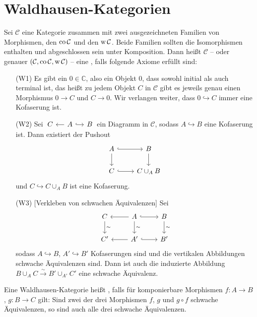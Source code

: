 \section{Waldhausen-Kategorien} %
\label{sec:5}

\begin{definition}[{name=[{Waldhausen Kategorie}]}]
	Sei $\mathcal{C}$ eine Kategorie zusammen mit zwei ausgezeichneten Familien von Morphismen, den  $\operatorname{co} \mathcal{C}$ und den  $\operatorname{w} \mathcal{C}$.
	Beide Familien sollten die Isomorphismen enthalten und abgeschlossen sein unter Komposition.
	Dann heißt $\mathcal{C}$ -- oder genauer $(\mathcal{C},\operatorname{co} \mathcal{C},\operatorname{w} \mathcal{C})$ -- eine , falls folgende Axiome erfüllt sind:
	\begin{enumerate}[(i)]
		\item[(W1)] Es gibt ein  $0 \in \mathbb{C}$, also ein Objekt $0$, dass sowohl initial als auch terminal ist, das heißt zu jedem Objekt $C$ in $\mathcal{C}$ gibt es jeweils genau einen Morphismus $0 \to C$ und $C \to 0$. 
		Wir verlangen weiter, dass $0 \hookrightarrow C$ immer eine Kofaserung ist.
		\item[(W2)] Sei $\!\begin{tikzcd}[sep=small] C & A \lar \rar[hook] & B \end{tikzcd}\!$ ein Diagramm in $\mathcal{C}$, sodass $A \hookrightarrow B$ eine Kofaserung ist.
		Dann existiert der Pushout
		\[
			\begin{tikzcd}
				A \rar[hook] \dar & B \dar  \\
				C \rar[hook] & C \cup_A B
			\end{tikzcd}
		\]
		und $C \hookrightarrow C \cup_A B$ ist eine Kofaserung.
		\item[(W3)] [Verkleben von schwachen Äquivalenzen] Sei 
		\[
			\begin{tikzcd}
				C \dar["\sim"] & A \lar \dar["\sim"] \rar[hook] & B \dar["\sim"] \\
				C' & A' \lar \rar[hook] & B'
			\end{tikzcd}
		\] 
		sodass $A \hookrightarrow B$, $A' \hookrightarrow B'$ Kofaserungen sind und die vertikalen Abbildungen schwache Äquivalenzen sind.
		Dann ist auch die induzierte Abbildung $B \cup_A C \xrightarrow{\sim} B' \cup_{A'} C'$ eine schwache Äquivalenz.
	\end{enumerate}
	Eine Waldhausen-Kategorie heißt , falls für komponierbare Morphismen $f \colon A \to B$, $g \colon B \to C$ gilt:
	Sind zwei der drei Morphismen $f$, $g$ und $ g \circ f$ schwache Äquivalenzen, so sind auch alle drei schwache Äquivalenzen.
\end{definition}

